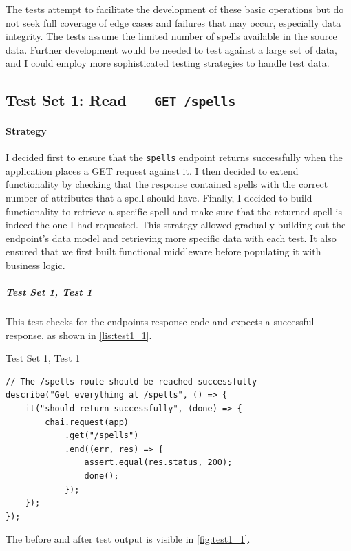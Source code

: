 The tests attempt to facilitate the development of these basic operations but do not seek full coverage of edge cases and failures that may occur, especially data integrity. The tests assume the limited number of spells available in the source data. Further development would be needed to test against a large set of data, and I could employ more sophisticated testing strategies to handle test data.

\subsection{Test Set 1: Read --- \texttt{GET /spells}}

\paragraph{Strategy} I decided first to ensure that the \texttt{spells} endpoint returns successfully when the application places a GET request against it. I then decided to extend functionality by checking that the response contained spells with the correct number of attributes that a spell should have. Finally, I decided to build functionality to retrieve a specific spell and make sure that the returned spell is indeed the one I had requested. This strategy allowed gradually building out the endpoint's data model and retrieving more specific data with each test. It also ensured that we first built functional middleware before populating it with business logic.

\subparagraph{Test Set 1, Test 1} This test checks for the endpoints response code and expects a successful response, as shown in \autoref{lis:test1_1}.

\begin{listing}[h]
\caption{Test Set 1, Test 1}
\label{lis:test1_1}

\begin{verbatim}
// The /spells route should be reached successfully
describe("Get everything at /spells", () => {
	it("should return successfully", (done) => {
		chai.request(app)
			.get("/spells")
			.end((err, res) => {
				assert.equal(res.status, 200);
				done();
			});
	});
});
\end{verbatim}
\end{listing}

The before and after test output is visible in \autoref{fig:test1_1}.

